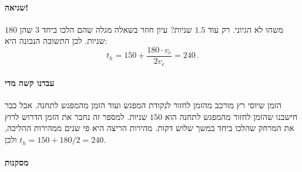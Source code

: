 \documentclass[12pt,a4paper]{article}
\begin{document}
\vspace{-4ex}\paragraph{שגיאה!}
משהו לא הגיוני. רק עוד
$1.5$
שניות? עיון חוזר בשאלה מגלה שהם הלכו ביחד
$3$
\textbf{}
שהן
$180$
שניות. לכן התשובה הנכונה היא:
\[
t_h = 150 + \frac{180\cdot v_e}{2v_e} = 240\,.
\]
\vspace{-4ex}\paragraph{עבדנו קשה מדי}

הזמן שיוסי רץ מורכב מהזמן לחזור לנקודת המפגש ועוד הזמן מהמפגש לתחנה. אבל כבר חישבנו שהזמן לחזור מהמפגש לתחנה הוא
$150$
שניות. למספר זה נחבר את הזמן הדרוש לרוץ את המרחק שהלכו ביחד במשך שלוש דקות. מהירות הריצה היא פי שנים ממהירות ההליכה, ולכן
$t_h = 150 + 180/2 = 240$.

\paragraph{מסקנות}
\end{document}
